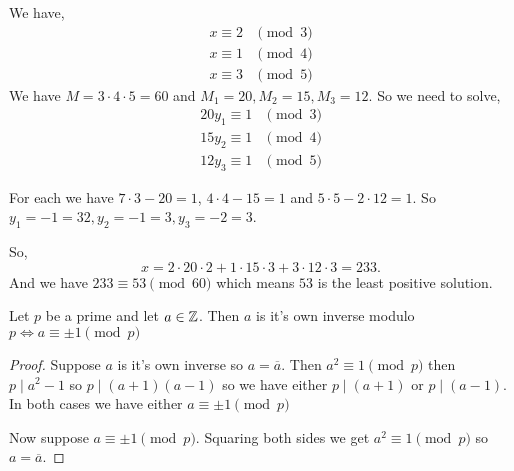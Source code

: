 \begin{eg}[Continued]
	We have, 
	\begin{align*}
		x \equiv 2 &\pmod 3\\
		x \equiv 1 &\pmod 4\\
		x \equiv 3 &\pmod 5
	\end{align*}
	We have \( M = 3 \cdot 4 \cdot 5 = 60 \) and \( M_1 = 20, M_2 = 15, M_3 = 12 \). So we need to solve, 
	\begin{align*}
		20y_1 \equiv 1 &\pmod 3\\
		15y_2 \equiv 1 &\pmod 4\\
		12y_3 \equiv 1 &\pmod 5
	\end{align*}

	For each we have \(  7 \cdot 3  - 20= 1 \), \( 4 \cdot 4 - 15 = 1 \) and \(  5 \cdot 5 - 2 \cdot 12 = 1\). So \( y_1 = -1 = 32, y_2 = -1 = 3, y_3 = -2 = 3 \). 

	So, \[
		x = 2 \cdot 20 \cdot 2 + 1 \cdot 15 \cdot 3 + 3 \cdot 12 \cdot 3 = 233
	.\] 
	And we have \( 233 \equiv 53 \pmod {60} \) which means \( 53 \) is the least positive solution.
\end{eg}



\begin{lemma}
	Let \( p \) be a prime and let \( a \in \mathbb{Z} \). Then \( a \) is it's own inverse modulo \( p  \iff a \equiv \pm 1 \pmod p\)
\end{lemma}
\begin{proof}
	Suppose \( a \) is it's own inverse so \( a = \overline a \). Then \( a^2 \equiv 1 \pmod p \) then \( p \mid a^2 - 1 \) so \( p \mid (a + 1)(a - 1) \) so we have either \( p \mid (a + 1) \) or \( p \mid (a - 1) \). In both cases we have either \( a \equiv \pm 1 \pmod p \)

	\vspace{1em}

	Now suppose \( a \equiv  \pm 1 \pmod p \). Squaring both sides we get \( a^2 \equiv 1 \pmod p \) so \( a = \overline a \).
\end{proof}


